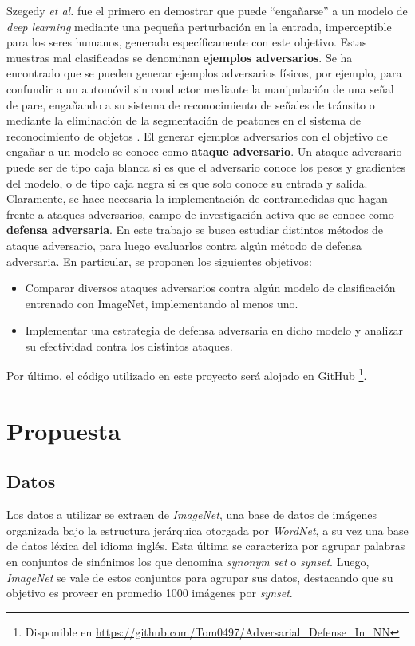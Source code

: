 \documentclass[conference]{IEEEtran}
\begin{document}
Szegedy \textit{et al.} \cite{goodfellow2013} fue el primero en demostrar que puede ``engañarse'' a un modelo de \textit{deep learning} mediante una pequeña perturbación en la entrada, imperceptible para los seres humanos, generada específicamente con este objetivo. Estas muestras mal clasificadas se denominan \textbf{ejemplos adversarios}. Se ha encontrado que se pueden generar ejemplos adversarios físicos, por ejemplo, para confundir a un automóvil sin conductor mediante la manipulación de una señal de pare, engañando a su sistema de reconocimiento de señales de tránsito \cite{kurakin2016physical, evtimov2017} o mediante la eliminación de la segmentación de peatones en el sistema de reconocimiento de objetos \cite{xie2017}. El generar ejemplos adversarios con el objetivo de engañar a un modelo se conoce como \textbf{ataque adversario}. Un ataque adversario puede ser de tipo caja blanca si es que el adversario conoce los pesos y gradientes del modelo, o de tipo caja negra si es que solo conoce su entrada y salida. Claramente, se hace necesaria la implementación de contramedidas que hagan frente a ataques adversarios, campo de investigación activa que se conoce como \textbf{defensa adversaria}.
En este trabajo se busca estudiar distintos métodos de ataque adversario, para luego evaluarlos contra algún método de defensa adversaria. En particular, se proponen los siguientes objetivos: 
\begin{itemize}
	\item Comparar diversos ataques adversarios contra algún modelo de clasificación entrenado con ImageNet, implementando al menos uno.
	\item Implementar una estrategia de defensa adversaria en dicho modelo y analizar su efectividad contra los distintos ataques.
\end{itemize}

Por último, el código utilizado en este proyecto será alojado en GitHub \footnote{Disponible en \url{https://github.com/Tom0497/Adversarial_Defense_In_NN}}. 

\section{Propuesta}

\subsection{Datos}

Los datos a utilizar se extraen de \textit{ImageNet}, una base de datos de imágenes organizada bajo la estructura jerárquica otorgada por \textit{WordNet}, a su vez una base de datos léxica del idioma inglés. Esta última se caracteriza por agrupar palabras en conjuntos de sinónimos los que denomina \textit{synonym set} o \textit{synset}. Luego, \textit{ImageNet} se vale de estos conjuntos para agrupar sus datos, destacando que su objetivo es proveer en promedio 1000 imágenes por \textit{synset}.
\end{document}
